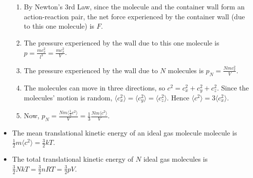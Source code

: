 \documentclass[oneside]{book}
\begin{document}
\begin{itemize}
\begin{enumerate}
        \item By Newton's 3rd Law, since the molecule and the container wall form an action-reaction pair, the net force experienced by the container wall (due to this one molecule) is \(F\).
        \item The pressure experienced by the wall due to this one molecule is \(p=\frac{mc_x^2}{l^3}=\frac{mc_x^2}{V}\).
        \item The pressure experienced by the wall due to \(N\) molecules is \(p_N=\frac{Nmc_x^2}{V}\).
        \item The molecules can move in three directions, so \(c^2=c_x^2+c_y^2+c_z^2\). Since the molecules' motion is random, \(\langle c_x^2 \rangle=\langle c_y^2 \rangle=\langle c_z^2 \rangle\). Hence \(\langle c^2 \rangle=3\langle c_x^2 \rangle\). 
        \item Now, \(p_N=\frac{Nm\langle \frac{1}{3}c^2\rangle}{V}=\frac{1}{3}\frac{Nm\langle c^2 \rangle}{V}\).
    \end{enumerate}
    \item The mean translational kinetic energy of an ideal gas molecule molecule is \(\frac{1}{2}m \langle c^2 \rangle=\frac{3}{2}kT\).
    \item The total translational kinetic energy of \(N\) ideal gas molecules is \(\frac{3}{2}NkT=\frac{3}{2}nRT=\frac{3}{2}pV\). 
\end{itemize}
\end{document}
